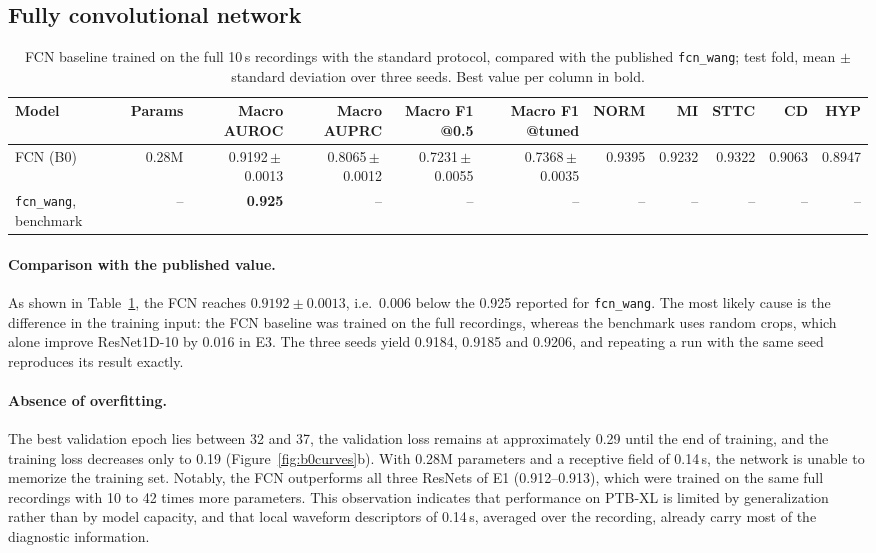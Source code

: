 \documentclass{article}
\newcommand{\fcnwang}{\texttt{fcn\_wang}}
\begin{document}
\subsection{Fully convolutional network}

\begin{table}[htb]
  \caption{FCN baseline trained on the full 10\,s recordings with the standard protocol, compared with the published \fcnwang{}; test fold, mean $\pm$ standard deviation over three seeds. Best value per column in bold.}
  \label{tab:fcn}
  \centering\footnotesize
  \begin{adjustbox}{max width=\linewidth}
  \begin{tabular}{lrrrrrrrrrr}
    \toprule
    Model & Params & Macro AUROC & Macro AUPRC & Macro F1 @0.5 & Macro F1 @tuned & NORM & MI & STTC & CD & HYP \\
    \midrule
    FCN (B0) & 0.28M & 0.9192\,$\pm$\,0.0013 & 0.8065\,$\pm$\,0.0012 & 0.7231\,$\pm$\,0.0055 & 0.7368\,$\pm$\,0.0035 & 0.9395 & 0.9232 & 0.9322 & 0.9063 & 0.8947 \\
    \texttt{fcn\_wang}, benchmark \citep{strodthoff2021} & -- & \textbf{0.925} & -- & -- & -- & -- & -- & -- & -- & -- \\
    \bottomrule
  \end{tabular}
  \end{adjustbox}
\end{table}


\paragraph{Comparison with the published value.} As shown in Table~\ref{tab:fcn}, the FCN reaches $0.9192\pm0.0013$, i.e.\ 0.006 below the 0.925 reported for \fcnwang{}. The most likely cause is the difference in the training input: the FCN baseline was trained on the full recordings, whereas the benchmark uses random crops, which alone improve ResNet1D-10 by 0.016 in E3. The three seeds yield 0.9184, 0.9185 and 0.9206, and repeating a run with the same seed reproduces its result exactly.

\paragraph{Absence of overfitting.} The best validation epoch lies between 32 and 37, the validation loss remains at approximately 0.29 until the end of training, and the training loss decreases only to 0.19 (Figure~\ref{fig:b0curves}b). With 0.28M parameters and a receptive field of 0.14\,s, the network is unable to memorize the training set. Notably, the FCN outperforms all three ResNets of E1 (0.912--0.913), which were trained on the same full recordings with 10 to 42 times more parameters. This observation indicates that performance on PTB-XL is limited by generalization rather than by model capacity, and that local waveform descriptors of 0.14\,s, averaged over the recording, already carry most of the diagnostic information.
\end{document}
